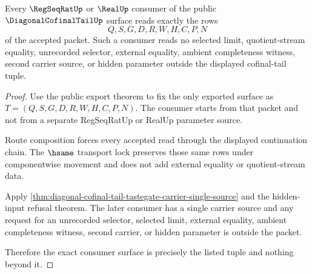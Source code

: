 \begin{theorem}
\label{thm:diagonal-cofinal-tail-public-consumer-exactness}
Every $\RegSeqRatUp$ or $\RealUp$ consumer of the public $\DiagonalCofinalTailUp$ surface reads exactly the rows
$$
Q,S,G,D,R,W,H,C,P,N
$$
of the accepted packet. Such a consumer reads no selected limit, quotient-stream equality, unrecorded selector, external equality, ambient completeness witness, second carrier source, or hidden parameter outside the displayed cofinal-tail tuple.
\end{theorem}
\begin{proof}
Use the public export theorem to fix the only exported surface as $T=(Q,S,G,D,R,W,H,C,P,N)$. The consumer starts from that packet and not from a separate RegSeqRatUp or RealUp parameter source.

Route composition forces every accepted read through the displayed continuation chain. The $\hsame$ transport lock preserves those same rows under componentwise movement and does not add external equality or quotient-stream data.

Apply \autoref{thm:diagonal-cofinal-tail-tastegate-carrier-single-source} and the hidden-input refusal theorem. The later consumer has a single carrier source and any request for an unrecorded selector, selected limit, external equality, ambient completeness witness, second carrier, or hidden parameter is outside the packet.

Therefore the exact consumer surface is precisely the listed tuple and nothing beyond it.
\end{proof}

